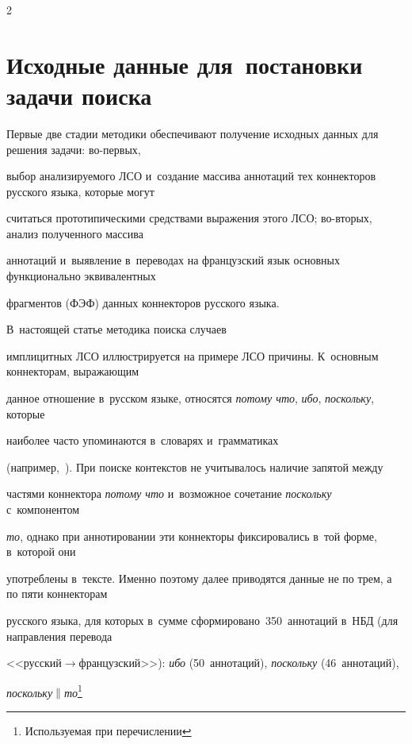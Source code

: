 \begin{multicols}{2}
   


\section{Исходные данные для~постановки задачи поиска}





\vspace*{-4pt}





Первые две стадии методики обеспечивают получение исходных данных для решения задачи: во-пер\-вых, 


выбор анализируемого ЛСО и~создание массива аннотаций тех коннекторов русского языка, которые могут 


считаться прототипическими средствами выражения этого ЛСО; во-вто\-рых, анализ полученного массива 


аннотаций и~выявление в~переводах на французский язык основных функционально эквивалентных 


фрагментов (ФЭФ) данных коннекторов русского языка. 


В~настоящей статье методика поиска случаев 


имплицитных ЛСО ил\-люст\-ри\-ру\-ет\-ся на примере ЛСО причины. К~основным коннекторам, выражающим 


данное отношение в~русском языке, относятся \textit{потому что}, \textit{ибо}, \textit{поскольку}, которые 


наиболее часто упоминаются в~словарях и~грамматиках  


(например,~\cite[с.~577--583]{12-in}). При поиске контекстов не учитывалось наличие запятой между 


частями коннектора \textit{потому что} и~возможное сочетание \textit{поскольку} с~компонентом 


\textit{то}, однако при аннотировании эти коннекторы фиксировались в~той форме, в~которой они 


употреблены в~тексте. Именно поэтому далее приводятся данные не по трем, а по пяти коннекторам 


русского языка, для которых в~сумме сформировано~350~аннотаций в~НБД (для направления перевода  


<<рус\-ский\;$\to$\;фран\-цуз\-ский>>): \textit{ибо} (50~аннотаций), \textit{поскольку} (46~аннотаций), 


\textit{поскольку}$\|$\textit{то}\footnote{Используемая при перечислении 


}
\end{multicols}
